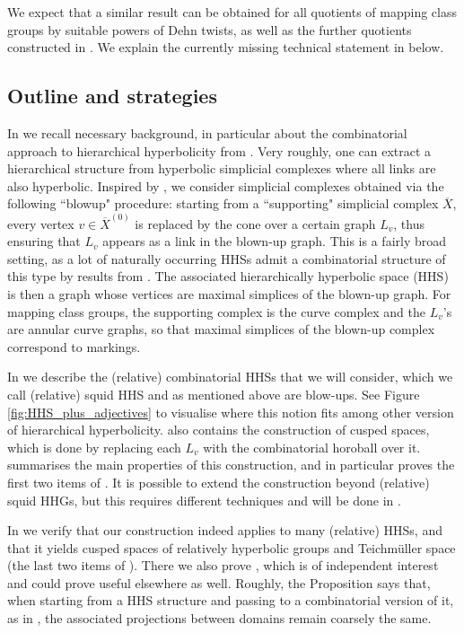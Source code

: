 \documentclass[svgnames]{amsart}
\theoremstyle{plain}
\theoremstyle{definition}
\newcommand{\squid}[1]{squid}
\newcommand{\ov}[1]{\overline{#1}}
\begin{document}
\noindent We expect that a similar result can be obtained for all quotients of mapping class groups by suitable powers of Dehn twists, as well as the further quotients constructed in \cite{BHMS}. We explain the currently missing technical statement in  below.


\subsection*{Outline and strategies}
In  we recall necessary background, in particular about the combinatorial approach to hierarchical hyperbolicity from \cite{BHMS}.  Very roughly, one can extract a hierarchical structure from hyperbolic simplicial complexes where all links are also hyperbolic. Inspired by \cite{converse}, we consider simplicial complexes obtained via the following ``blowup" procedure: starting from a ``supporting" simplicial complex $\ov X$, every vertex $v\in \ov X^{(0)}$ is replaced by the cone over a certain graph $L_v$, thus ensuring that $L_v$ appears as a link in the blown-up graph. This is a fairly broad setting, as a lot of naturally occurring HHSs admit a combinatorial structure of this type by results from \cite{converse}. The associated hierarchically hyperbolic space (HHS) is then a graph whose vertices are maximal simplices of the blown-up graph.  For mapping class groups, the supporting complex is the curve complex and the $L_v$'s are annular curve graphs, so that maximal simplices of the blown-up complex correspond to markings.
  

In  we describe the (relative) combinatorial HHSs that we will consider, which we call (relative) \squid{} HHS and as mentioned above are blow-ups. See Figure \ref{fig:HHS_plus_adjectives} to visualise where this notion fits among other version of hierarchical hyperbolicity.  also contains the construction of cusped spaces, which is done by replacing each $L_v$ with the combinatorial horoball over it.  summarises the main properties of this construction, and in particular proves the first two items of . It is possible to extend the construction beyond (relative) \squid{} HHGs, but this requires different techniques and will be done in \cite{HPZ_in_progress}.

In  we verify that our construction indeed applies to many (relative) HHSs, and that it yields cusped spaces of relatively hyperbolic groups and Teichm\"{u}ller space (the last two items of ). There we also prove , which is of independent interest and could prove useful elsewhere as well. Roughly, the Proposition says that, when starting from a HHS structure and passing to a combinatorial version of it, as in \cite{converse}, the associated projections between domains remain coarsely the same.
\end{document}
